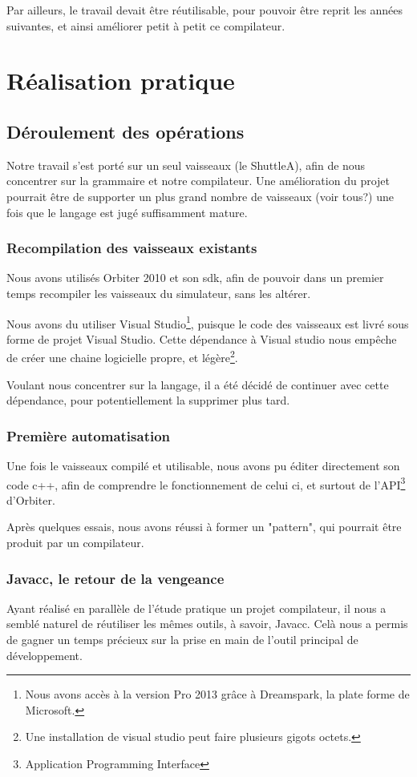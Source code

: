 \documentclass[a4paper,11pt]{article}
\begin{document}
        Par ailleurs, le travail devait être réutilisable, pour pouvoir être reprit les années suivantes, et ainsi améliorer petit à petit ce compilateur.

\section{Réalisation pratique}
    \subsection{Déroulement des opérations}
        Notre travail s'est porté sur un seul vaisseaux (le ShuttleA), afin de nous concentrer sur la grammaire et notre compilateur. Une amélioration du projet pourrait être de supporter un plus grand nombre de vaisseaux (voir tous?) une fois que le langage est jugé suffisamment mature.

    \subsubsection{Recompilation des vaisseaux existants}
        Nous avons utilisés Orbiter 2010 et son sdk, afin de pouvoir dans un premier temps recompiler les vaisseaux du simulateur, sans les altérer.

        Nous avons du utiliser Visual Studio\footnote{Nous avons accès à la version Pro 2013 grâce à Dreamspark, la plate forme de Microsoft.}, puisque le code des vaisseaux est livré sous forme de projet Visual Studio. Cette dépendance à Visual studio nous empêche de créer une chaine logicielle propre, et légère\footnote{Une installation de visual studio peut faire plusieurs gigots octets.}.

        Voulant nous concentrer sur la langage, il a été décidé de continuer avec cette dépendance, pour potentiellement la supprimer plus tard.

    \subsubsection{Première automatisation}
        Une fois le vaisseaux compilé et utilisable, nous avons pu éditer directement son code c++, afin de comprendre le fonctionnement de celui ci, et surtout de l'API\footnote{Application Programming Interface} d'Orbiter.

        Après quelques essais, nous avons réussi à former un "pattern", qui pourrait être produit par un compilateur.

    \subsubsection{Javacc, le retour de la vengeance}
        Ayant réalisé en parallèle de l'étude pratique un projet compilateur, il nous a semblé naturel de réutiliser les mêmes outils, à savoir, Javacc. Celà nous a permis de gagner un temps précieux sur la prise en main de l'outil principal de développement.
\end{document}
